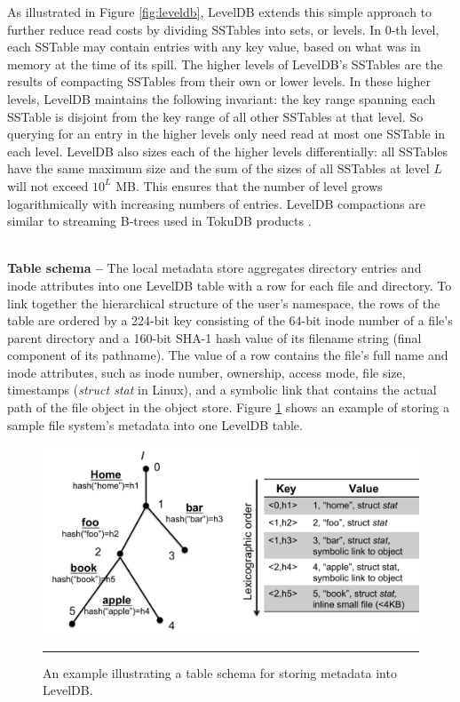 As illustrated in Figure \ref{fig:leveldb}, LevelDB extends this simple approach to further reduce read costs by dividing SSTables into sets, or levels.
In 0-th level, each SSTable may contain entries with any key value, based on what was in memory at the time of its spill.
The higher levels of LevelDB's SSTables are the results of compacting SSTables from their own or lower levels.
In these higher levels, LevelDB maintains the following invariant: the key range spanning each SSTable is disjoint from the key range of all other SSTables at that level.
So querying for an entry in the higher levels only need read at most one SSTable in each level.
LevelDB also sizes each of the higher levels differentially:  all SSTables have the same maximum size and the sum of the sizes of all SSTables at level $L$ will not exceed $10^L$ MB.
This ensures that the number of level grows logarithmically with increasing numbers of entries.
LevelDB compactions are similar to streaming B-trees used in TokuDB products
\cite{Bender2007, tokufs}.

~\\
\textbf{Table schema -- } 
The local metadata store aggregates directory entries and  
inode attributes into one LevelDB table with a row for each file and directory.
To link together the hierarchical structure of the user's namespace,
the rows of the table are ordered by a 224-bit key consisting of 
the 64-bit inode number of a file's parent directory 
and a 160-bit SHA-1 hash value of its filename string (final component of its pathname).
The value of a row contains the file's full name and inode attributes,
such as inode number, ownership, access mode, file size, timestamps (\textit{struct stat} in Linux),
and a symbolic link that contains the actual path of the file object in the object store.
Figure \ref{fig:schema} shows an example of storing a sample file system's metadata into one LevelDB table.

\begin{figure}[t]
\centering
\includegraphics[scale=0.35]{figs/schema}
\caption{\normalsize
An example illustrating a table schema for storing metadata into LevelDB.}
\vspace{10pt}
\hrule 
\label{fig:schema}
\end{figure}

